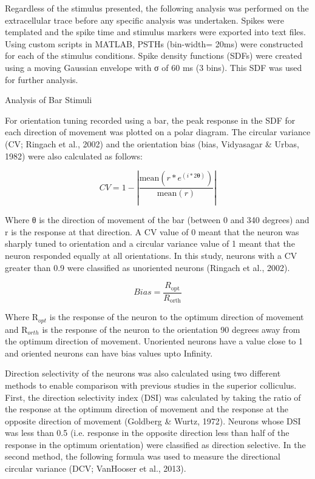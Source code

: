 Regardless of the stimulus presented, the following analysis was
performed on the extracellular trace before any specific analysis was
undertaken. Spikes were templated and the spike time and stimulus
markers were exported into text files. Using custom scripts in MATLAB,
PSTHs (bin-width= 20ms) were constructed for each of the stimulus
conditions. Spike density functions (SDFs) were created using a moving
Gaussian envelope with σ of 60 ms (3 bins). This SDF was used for
further analysis.

{Analysis of Bar Stimuli}

For orientation tuning recorded using a bar, the peak response in the
SDF for each direction of movement was plotted on a polar diagram. The
circular variance (CV; Ringach et al., 2002) and the orientation bias
(bias, Vidyasagar \& Urbas, 1982) were also calculated as follows:

\begin{equation} \label{cv}
CV=1 - |\frac{\text{mean}\left( r*e^{(i*2\mathbf{\theta})} \right)}{\text{mean}\left( r \right)}|
\end{equation}

Where θ is the direction of movement of the bar (between 0 and 340
degrees) and r is the response at that direction. A CV value of 0 meant
that the neuron was sharply tuned to orientation and a circular variance
value of 1 meant that the neuron responded equally at all orientations.
In this study, neurons with a CV greater than 0.9 were classified as
unoriented neurons (Ringach et al., 2002).

\begin{equation} \label{bias}
Bias=\frac{R_{\text{opt}}}{R_{\text{orth}}}
\end{equation}


Where R$_{opt}$ is the response of the neuron to the optimum
direction of movement and R$_{orth}$ is the response of the
neuron to the orientation 90 degrees away from the optimum direction of
movement. Unoriented neurons have a value close to 1 and oriented
neurons can have bias values upto Infinity.

Direction selectivity of the neurons was also calculated using two
different methods to enable comparison with previous studies in the
superior colliculus. First, the direction selectivity index (DSI) was
calculated by taking the ratio of the response at the optimum direction
of movement and the response at the opposite direction of movement
(Goldberg \& Wurtz, 1972). Neurons whose DSI was less than 0.5 (i.e.
response in the opposite direction less than half of the response in the
optimum orientation) were classified as direction selective. In the
second method, the following formula was used to measure the directional
circular variance (DCV; VanHooser et al., 2013).

